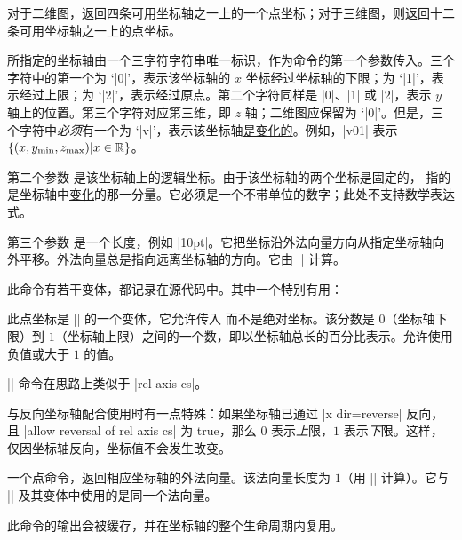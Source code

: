 \begin{command}{\pgfplotsqpointoutsideofaxis%
}
    对于二维图，返回四条可用坐标轴之一上的一个点坐标；对于三维图，则返回十二条可用坐标轴之一上的点坐标。

    所指定的坐标轴由一个三字符字符串唯一标识，作为命令的第一个参数传入。三个字符中的第一个为 `|0|'，表示该坐标轴的 $x$ 坐标经过坐标轴的下限；为 `|1|'，表示经过上限；为 `|2|'，表示经过原点。第二个字符同样是 |0|、|1| 或 |2|，表示 $y$ 轴上的位置。第三个字符对应第三维，即 $z$ 轴；二维图应保留为 `|0|'。但是，三个字符中\emph{必须}有一个为 `|v|'，表示该坐标轴\underline{是变化的}。例如，|v01| 表示 $\{ (x,y_{\min},z_{\max}) \vert x \in \mathbb{R} \}$。

    第二个参数  是该坐标轴上的逻辑坐标。由于该坐标轴的两个坐标是固定的， 指的是坐标轴中\underline{变化}的那一分量。它必须是一个不带单位的数字；此处不支持数学表达式。

    第三个参数  是一个长度，例如 |10pt|。它把坐标沿外法向量方向从指定坐标轴向外平移。外法向量总是指向远离坐标轴的方向。它由 |\pgfplotspointouternormalvectorofaxis| 计算。

    此命令有若干变体，都记录在源代码中。其中一个特别有用：
\end{command}

\begin{command}{\pgfplotsqpointoutsideofaxisrel%
        \allowbreak{}\allowbreak{}\allowbreak{}%
}
    此点坐标是 |\pgfplotsqpointoutsideofaxis| 的一个变体，它允许传入  而不是绝对坐标。该分数是 $0$（坐标轴下限）到 $1$（坐标轴上限）之间的一个数，即以坐标轴总长的百分比表示。允许使用负值或大于 $1$ 的值。

    |\pgfplotsqpointoutsideofaxisrel| 命令在思路上类似于
    |rel axis cs|。

    与反向坐标轴配合使用时有一点特殊：如果坐标轴已通过 |x dir=reverse| 反向，且 |allow reversal of rel axis cs| 为 true，那么 $0$ 表示\emph{上}限，$1$ 表示\emph{下}限。这样，仅因坐标轴反向，坐标值不会发生改变。
\end{command}

\begin{command}{\pgfplotspointouternormalvectorofaxis{}}
    一个点命令，返回相应坐标轴的外法向量。该法向量长度为 $1$（用
    |\pgfpointnormalised| 计算）。它与 |\pgfplotsqpointoutsideofaxis| 及其变体中使用的是同一个法向量。

    此命令的输出会被缓存，并在坐标轴的整个生命周期内复用。
\end{command}

